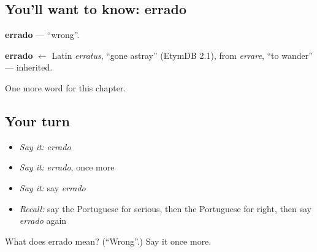 \subsection*{You'll want to know: errado}
\textbf{errado} — \textquotedblleft{}wrong\textquotedblright{}.

\begin{cousinweb}
\textbf{errado} $\leftarrow$ Latin \emph{erratus}, \textquotedblleft{}gone astray\textquotedblright{} (EtymDB 2.1), from \emph{errare}, \textquotedblleft{}to wander\textquotedblright{} — inherited.
\end{cousinweb}

\begin{grammarlens}[title={What you've built}]
One more word for this chapter.
\end{grammarlens}

\subsection*{Your turn}
\begin{itemize}
\raggedright
  \item \emph{Say it:} \emph{errado}
  \item \emph{Say it:} \emph{errado}, once more
  \item \emph{Say it:} say \emph{errado}
  \item \emph{Recall:} say the Portuguese for serious, then the Portuguese for right, then say \emph{errado} again
\end{itemize}

\begin{tcolorbox}[breakable,colback=teal!4,colframe=teal!35!black,title={Before you move on}]
What does errado mean? (\textquotedblleft{}Wrong\textquotedblright{}.) Say it once more.
\end{tcolorbox}
